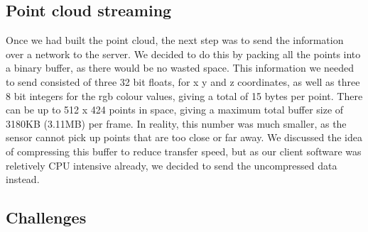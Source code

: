 \documentclass{article}
\begin{document}
\subsection{Point cloud streaming}
Once we had built the point cloud, the next step was to send the information over a network to the server. We decided to do this by packing all the points into a binary buffer, as there would be no wasted space. This information we needed to send consisted of three 32 bit floats, for x y and z coordinates, as well as three 8 bit integers for the rgb colour values, giving a total of 15 bytes per point. There can be up to 512 x 424 points in space, giving a maximum total buffer size of 3180KB (3.11MB) per frame. In reality, this number was much smaller, as the sensor cannot pick up points that are too close or far away. We discussed the idea of compressing this buffer to reduce transfer speed, but as our client software was reletively CPU intensive already, we decided to send the uncompressed data instead.

\subsection{Challenges}
\end{document}

